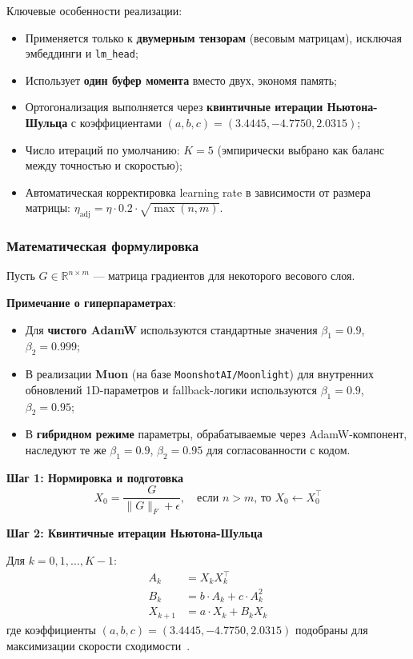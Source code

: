 \documentclass[a4paper,12pt]{article}
\begin{document}
Ключевые особенности реализации:
\begin{itemize}
    \item Применяется только к \textbf{двумерным тензорам} (весовым матрицам), исключая эмбеддинги и \texttt{lm\_head};
    \item Использует \textbf{один буфер момента} вместо двух, экономя память;
    \item Ортогонализация выполняется через \textbf{квинтичные итерации Ньютона-Шульца} с коэффициентами $(a, b, c) = (3.4445, -4.7750, 2.0315)$;
    \item Число итераций по умолчанию: $K = 5$ (эмпирически выбрано как баланс между точностью и скоростью);
    \item Автоматическая корректировка learning rate в зависимости от размера матрицы: $\eta_{\text{adj}} = \eta \cdot 0.2 \cdot \sqrt{\max(n, m)}$.
\end{itemize}

\subsubsection{Математическая формулировка}

Пусть $G \in \mathbb{R}^{n \times m}$ --- матрица градиентов для некоторого весового слоя.

\textbf{Примечание о гиперпараметрах}: 
\begin{itemize}
    \item Для \textbf{чистого AdamW} используются стандартные значения $\beta_1 = 0.9$, $\beta_2 = 0.999$;
    \item В реализации \textbf{Muon} (на базе \texttt{MoonshotAI/Moonlight}) для внутренних обновлений 1D-параметров и fallback-логики используются $\beta_1 = 0.9$, $\beta_2 = 0.95$;
    \item В \textbf{гибридном режиме} параметры, обрабатываемые через AdamW-компонент, наследуют те же $\beta_1 = 0.9$, $\beta_2 = 0.95$ для согласованности с кодом.
\end{itemize}

\textbf{Шаг 1: Нормировка и подготовка}
\begin{equation}
    X_0 = \frac{G}{\|G\|_F + \epsilon}, \quad \text{если } n > m \text{, то } X_0 \gets X_0^\top
\end{equation}

\textbf{Шаг 2: Квинтичные итерации Ньютона-Шульца}

Для $k = 0, 1, \ldots, K-1$:
\begin{align}
    A_k &= X_k X_k^\top \\
    B_k &= b \cdot A_k + c \cdot A_k^2 \\
    X_{k+1} &= a \cdot X_k + B_k X_k
\end{align}
где коэффициенты $(a, b, c) = (3.4445, -4.7750, 2.0315)$ подобраны для максимизации скорости сходимости~\cite{moonshot2024muon}.
\end{document}
